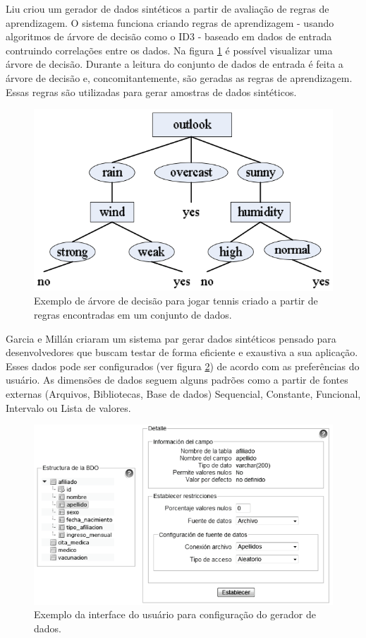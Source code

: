 \documentclass[
	12pt,				%
	openright,			%
	twoside,			%
	a4paper,			%
	english,			%
	brazil				%
	]{abntex2}
\begin{document}
			Liu \cite{Liu2016} criou um gerador de dados sintéticos a partir de avaliação de regras de aprendizagem. O sistema funciona criando regras de aprendizagem - usando algoritmos de árvore de decisão como o ID3 - baseado em dados de entrada contruindo correlações entre os dados. Na figura \ref{fig:liu} é possível visualizar uma árvore de decisão. Durante a leitura do conjunto de dados de entrada é feita a árvore de decisão e, concomitantemente, são geradas as regras de aprendizagem. Essas regras são utilizadas para gerar amostras de dados sintéticos.
			\begin{figure}[h!]
				\centering
				\includegraphics[width=\linewidth]{./figures/TrabalhosRelacionados/Liu13.png}
				\caption{Exemplo de árvore de decisão para jogar tennis criado a partir de regras encontradas em um conjunto de dados.}
				\label{fig:liu}
			\end{figure}

			Garcia e Millán \cite{Garcia2011} criaram um sistema par gerar dados sintéticos pensado para desenvolvedores que buscam testar de forma eficiente e exaustiva a sua aplicação. Esses dados pode ser configurados (ver figura \ref{fig:garcia}) de acordo com as preferências do usuário. As dimensões de dados seguem alguns padrões como a partir de fontes externas (Arquivos, Bibliotecas, Base de dados) Sequencial, Constante, Funcional, Intervalo ou Lista de valores. 
			\begin{figure}[h!]
				\centering
				\includegraphics[width=\linewidth]{./figures/TrabalhosRelacionados/Garcia18.png}
				\caption{Exemplo da interface do usuário para configuração do gerador de dados.}
				\label{fig:garcia}
			\end{figure}
\end{document}
